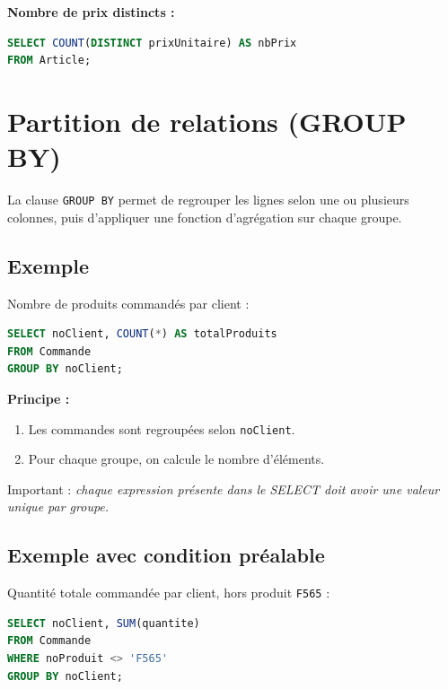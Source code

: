 \textbf{Nombre de prix distincts :}

\begin{sqlcodebox}
\begin{lstlisting}[language=SQL]
SELECT COUNT(DISTINCT prixUnitaire) AS nbPrix
FROM Article;
\end{lstlisting}
\end{sqlcodebox}


\section{Partition de relations (GROUP BY)}

La clause \texttt{GROUP BY} permet de regrouper les lignes selon une ou plusieurs colonnes, puis d’appliquer une fonction d’agrégation sur chaque groupe.

\subsection*{Exemple}

Nombre de produits commandés par client :

\begin{sqlcodebox}
\begin{lstlisting}[language=SQL]
SELECT noClient, COUNT(*) AS totalProduits
FROM Commande
GROUP BY noClient;
\end{lstlisting}
\end{sqlcodebox}

\textbf{Principe :}
\begin{enumerate}
    \item Les commandes sont regroupées selon \texttt{noClient}.
    \item Pour chaque groupe, on calcule le nombre d’éléments.
\end{enumerate}

Important : \textit{chaque expression présente dans le SELECT doit avoir une valeur unique par groupe.}

\subsection*{Exemple avec condition préalable}

Quantité totale commandée par client, hors produit \texttt{F565} :

\begin{sqlcodebox}
\begin{lstlisting}[language=SQL]
SELECT noClient, SUM(quantite)
FROM Commande
WHERE noProduit <> 'F565'
GROUP BY noClient;
\end{lstlisting}
\end{sqlcodebox}

